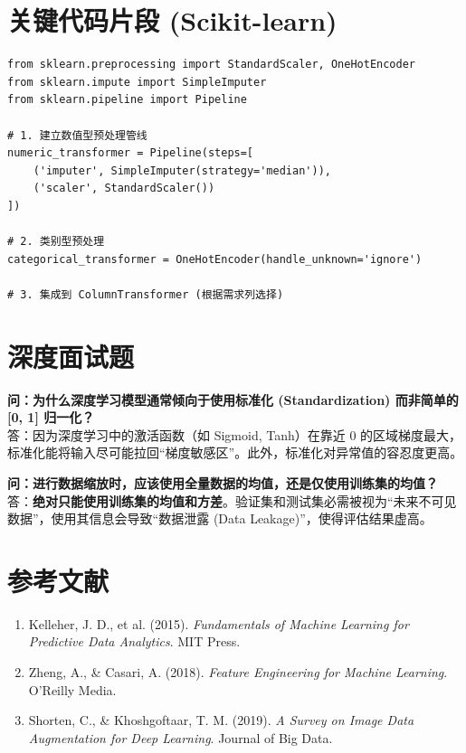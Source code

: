 \documentclass[12pt, a4paper]{article}
\begin{document}
\section{关键代码片段 (Scikit-learn)}
\begin{lstlisting}
from sklearn.preprocessing import StandardScaler, OneHotEncoder
from sklearn.impute import SimpleImputer
from sklearn.pipeline import Pipeline

# 1. 建立数值型预处理管线
numeric_transformer = Pipeline(steps=[
    ('imputer', SimpleImputer(strategy='median')),
    ('scaler', StandardScaler())
])

# 2. 类别型预处理
categorical_transformer = OneHotEncoder(handle_unknown='ignore')

# 3. 集成到 ColumnTransformer (根据需求列选择)
\end{lstlisting}

\section{深度面试题}

\textbf{问：为什么深度学习模型通常倾向于使用标准化 (Standardization) 而非简单的 [0, 1] 归一化？}\\
答：因为深度学习中的激活函数（如 Sigmoid, Tanh）在靠近 0 的区域梯度最大，标准化能将输入尽可能拉回“梯度敏感区”。此外，标准化对异常值的容忍度更高。

\textbf{问：进行数据缩放时，应该使用全量数据的均值，还是仅使用训练集的均值？}\\
答：\textbf{绝对只能使用训练集的均值和方差}。验证集和测试集必需被视为“未来不可见数据”，使用其信息会导致“数据泄露 (Data Leakage)”，使得评估结果虚高。

\section{参考文献}
\begin{enumerate}
    \item Kelleher, J. D., et al. (2015). \textit{Fundamentals of Machine Learning for Predictive Data Analytics}. MIT Press.
    \item Zheng, A., \& Casari, A. (2018). \textit{Feature Engineering for Machine Learning}. O'Reilly Media.
    \item Shorten, C., \& Khoshgoftaar, T. M. (2019). \textit{A Survey on Image Data Augmentation for Deep Learning}. Journal of Big Data.
\end{enumerate}
\end{document}
